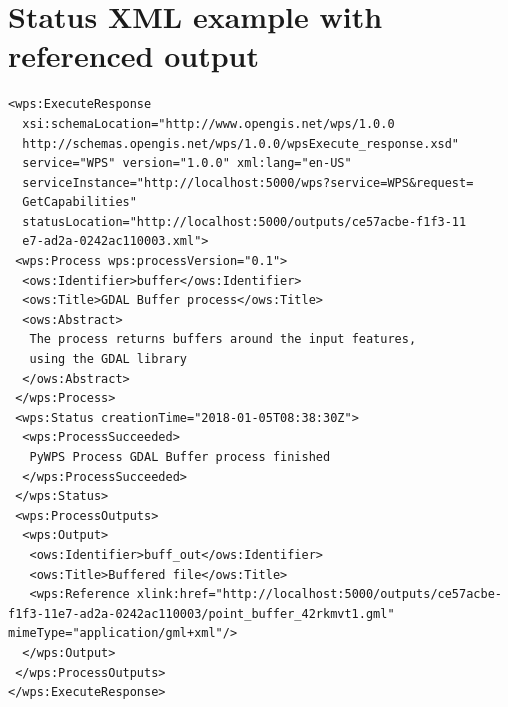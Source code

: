 \documentclass[12pt,a4paper]{article}
\begin{document}
\newpage
\section{Status XML example with referenced output}
\label{app:status_reference}
\begin{lstlisting}[basicstyle=\small,caption={Status XML example}]
<wps:ExecuteResponse
  xsi:schemaLocation="http://www.opengis.net/wps/1.0.0 
  http://schemas.opengis.net/wps/1.0.0/wpsExecute_response.xsd" 
  service="WPS" version="1.0.0" xml:lang="en-US"
  serviceInstance="http://localhost:5000/wps?service=WPS&request=
  GetCapabilities" 
  statusLocation="http://localhost:5000/outputs/ce57acbe-f1f3-11
  e7-ad2a-0242ac110003.xml">
 <wps:Process wps:processVersion="0.1">
  <ows:Identifier>buffer</ows:Identifier>
  <ows:Title>GDAL Buffer process</ows:Title>
  <ows:Abstract>
   The process returns buffers around the input features,
   using the GDAL library
  </ows:Abstract>
 </wps:Process>
 <wps:Status creationTime="2018-01-05T08:38:30Z">
  <wps:ProcessSucceeded>
   PyWPS Process GDAL Buffer process finished
  </wps:ProcessSucceeded>
 </wps:Status>
 <wps:ProcessOutputs>
  <wps:Output>
   <ows:Identifier>buff_out</ows:Identifier>
   <ows:Title>Buffered file</ows:Title>
   <wps:Reference xlink:href="http://localhost:5000/outputs/ce57acbe-f1f3-11e7-ad2a-0242ac110003/point_buffer_42rkmvt1.gml" mimeType="application/gml+xml"/>
  </wps:Output>
 </wps:ProcessOutputs>
</wps:ExecuteResponse>
\end{lstlisting}
\end{document}
